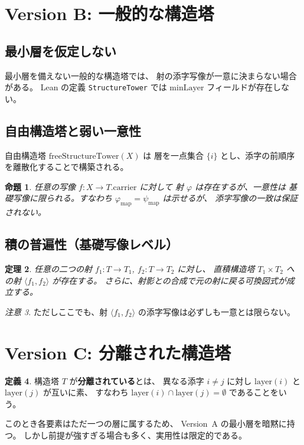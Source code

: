 \documentclass[luatex,a4paper]{ltjsarticle}
\theoremstyle{definition}
\newtheorem{definition}{定義}[section]
\theoremstyle{plain}
\newtheorem{theorem}[definition]{定理}
\newtheorem{proposition}[definition]{命題}
\theoremstyle{remark}
\newtheorem{remark}[definition]{注意}
\begin{document}
\section{Version B: 一般的な構造塔}
\subsection{最小層を仮定しない}
最小層を備えない一般的な構造塔では、
射の添字写像が一意に決まらない場合がある。
Lean の定義 \texttt{StructureTower} では
$\mathrm{minLayer}$ フィールドが存在しない。

\subsection{自由構造塔と弱い一意性}
自由構造塔 $\mathrm{freeStructureTower}(X)$ は
層を一点集合 $\{i\}$ とし、添字の前順序を離散化することで構築される。
\begin{proposition}
任意の写像 $f : X \to T.\mathrm{carrier}$ に対して
射 $\varphi$ は存在するが、一意性は
基礎写像に限られる。すなわち
$\varphi_{\mathrm{map}} = \psi_{\mathrm{map}}$ は示せるが、
添字写像の一致は保証されない。
\end{proposition}

\subsection{積の普遍性（基礎写像レベル）}
\begin{theorem}
任意の二つの射 $f_1 : T \to T_1$, $f_2 : T \to T_2$ に対し、
直積構造塔 $T_1 \times T_2$ への射 $\langle f_1,f_2 \rangle$ が存在する。
さらに、射影との合成で元の射に戻る可換図式が成立する。
\end{theorem}
\begin{remark}
ただしここでも、射 $\langle f_1,f_2 \rangle$ の添字写像は必ずしも一意とは限らない。
\end{remark}

\section{Version C: 分離された構造塔}
\begin{definition}
構造塔 $T$ が\textbf{分離されている}とは、
異なる添字 $i \neq j$ に対し $\mathrm{layer}(i)$ と $\mathrm{layer}(j)$ が互いに素、
すなわち $\mathrm{layer}(i) \cap \mathrm{layer}(j) = \emptyset$ であることをいう。
\end{definition}
このとき各要素はただ一つの層に属するため、
Version~A の最小層を暗黙に持つ。
しかし前提が強すぎる場合も多く、実用性は限定的である。
\end{document}

